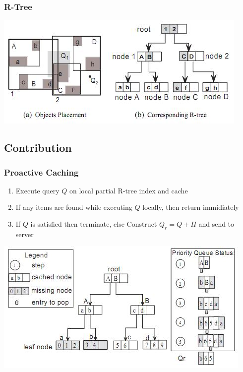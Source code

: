 \begin{frame}
\frametitle{R-Tree}

\begin{center}
\includegraphics[scale=0.95]{images/r-tree.jpg}
\end{center}
\end{frame}


\subsection{Contribution}

\begin{frame}
\frametitle{Proactive Caching}

\begin{enumerate}
\item Execute query $Q$ on local partial R-tree index and cache
\item If any items are found while executing $Q$ locally, then return immidiately
\item If $Q$ is satisfied then terminate, else Construct $Q_r = Q + H$ and send to server
\end{enumerate}

\begin{center}
\includegraphics[scale=0.55]{images/kNNproactive-caching.jpg}
\end{center}

\end{frame}

